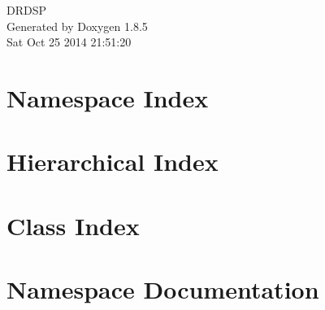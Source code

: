 \documentclass[twoside]{book}
\newcommand{\clearemptydoublepage}{%
  \newpage{\pagestyle{empty}\cleardoublepage}%
}
\begin{document}
\hypersetup{pageanchor=false}
\begin{titlepage}
\vspace*{7cm}
\begin{center}%
{\Large D\-R\-D\-S\-P }\\
\vspace*{1cm}
{\large Generated by Doxygen 1.8.5}\\
\vspace*{0.5cm}
{\small Sat Oct 25 2014 21:51:20}\\
\end{center}
\end{titlepage}
\clearemptydoublepage
\tableofcontents
\clearemptydoublepage
{}
\hypersetup{pageanchor=true}

\chapter{Namespace Index}

\chapter{Hierarchical Index}

\chapter{Class Index}

\chapter{Namespace Documentation}

\end{document}
